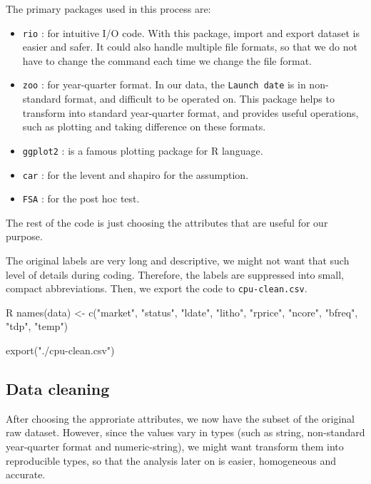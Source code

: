 The primary packages used in this process are:

\begin{itemize}
    \item \verb|rio| : for intuitive I/O code.
    With this package, import and export dataset is easier and safer. It could 
    also handle multiple file formats, so that we do not have to
    change the command each time we change the file format.

    \item \verb|zoo| : for year-quarter format.
    In our data, the \verb|Launch date| is in non-standard format, and difficult to be operated on. This package helps to transform
    into standard year-quarter format, and provides useful operations, such as plotting and taking difference on these formats.

    \item \verb|ggplot2| : is a famous plotting package for R language.

    \item \verb|car| : for the levent and shapiro for the assumption.
    \item \verb|FSA| : for the post hoc test.
\end{itemize}

The rest of the code is just choosing the attributes that are useful for our purpose.

The original labels are very long and descriptive, we might not want that such level of details during coding. Therefore, the labels are suppressed
into small, compact abbreviations. Then, we export the code to \verb|cpu-clean.csv|.

\begin{code}{R}
names(data) <- c("market", "status", "ldate", "litho", 
    "rprice", "ncore", "bfreq", "tdp", 
    "temp")

export("./cpu-clean.csv")
\end{code}









\subsection{Data cleaning}
\label{subsection:data_cleaning}

After choosing the approriate attributes, we now have the subset of the original raw dataset. 
However, since the values vary in types (such as string, non-standard year-quarter format and numeric-string),
we might want transform them into reproducible types, so that the analysis later on is easier, homogeneous and accurate.

